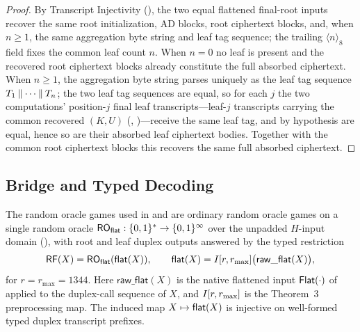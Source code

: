 \begin{proof}
By Transcript Injectivity (), the two equal
flattened final-root inputs recover the same root initialization, AD
blocks, root ciphertext blocks, and, when $n \geq 1$, the same
aggregation byte string and leaf tag sequence; the trailing
$\langle n \rangle_8$ field fixes the common leaf count $n$. When
$n = 0$ no leaf is present and the recovered root ciphertext blocks
already constitute the full absorbed ciphertext. When $n \geq 1$, the
aggregation byte string parses uniquely as the leaf tag sequence
$T_1 \mathbin{\|} \cdots \mathbin{\|} T_n$; the two leaf tag sequences are equal,
so for each $j$ the two computations' position-$j$ final leaf
transcripts---leaf-$j$ transcripts carrying the common recovered
$(K, U)$ (, )---receive the same
leaf tag, and by hypothesis are equal, hence so are
their absorbed leaf ciphertext bodies. Together with the common root
ciphertext blocks this recovers the same full absorbed ciphertext.
\end{proof}

\subsection{Bridge and Typed Decoding}
\label{app:lem-bridge-decode}

\begin{lemma}
\label{lem:bridge-decode}
The random oracle games used in
 and  are
ordinary random oracle games on a single random oracle
$\mathsf{RO}_{\mathsf{flat}} : \{0,1\}^* \to \{0,1\}^\infty$ over the unpadded
\cite{BDPV08} $H$-input domain (), with \TW{} root and
leaf duplex outputs answered by the typed restriction
\[
  \mathsf{RF}(X) = \mathsf{RO}_{\mathsf{flat}}(\mathsf{flat}(X)),
  \qquad \mathsf{flat}(X) = I[r, r_{\max}]\bigl(\mathsf{raw\_flat}(X)\bigr),
\]
for $r = r_{\max} = 1344$. Here $\mathsf{raw\_flat}(X)$ is the native
flattened input $\mathsf{Flat}(\cdot)$ of  applied to
the duplex-call sequence of $X$, and $I[r, r_{\max}]$ is the
\cite{BDPV11} Theorem~3 preprocessing map. The induced map
$X \mapsto \mathsf{flat}(X)$ is injective on well-formed typed \TW{} duplex
transcript prefixes.
\end{lemma}

